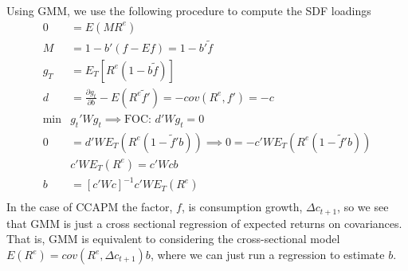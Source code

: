 \documentclass[french, 11pt]{article}
\begin{document}
Using GMM, we use the following procedure to compute the SDF loadings
\begin{equation*}
	\begin{split}
	0 &= E(MR^e)\\
	M &= 1-b'(f-Ef) = 1-b'\tilde{f} \\
	g_T &= E_T\left[R^e(1-b\tilde{f})\right]\\
	d &= \frac{\partial g_t}{\partial b}-E(R^e\tilde{f}')=-cov(R^e, f') = -c\\
	\min& g_t'Wg_t \implies \text{FOC:  } d'Wg_t = 0\\
	0&=d'W E_T(R^e(1-\tilde{f}'b))\implies 0=-c'W E_T(R^e(1-\tilde{f}'b))\\
	& c'WE_T(R^e) = c'Wcb\\
	b &= \left[c'Wc\right]^{-1}c'WE_T(R^e)\\
	\end{split}
\end{equation*}
In the case of CCAPM the factor, $f$,  is consumption growth, $\Delta c_{t+1}$, so we see that GMM is just a cross sectional regression of expected returns on covariances. That is, GMM is equivalent to considering the cross-sectional model $E(R^{e}) = cov(R^{e}, \Delta c_{t+1}) b$, where we can just run a regression to estimate $b$. 
\end{document}
